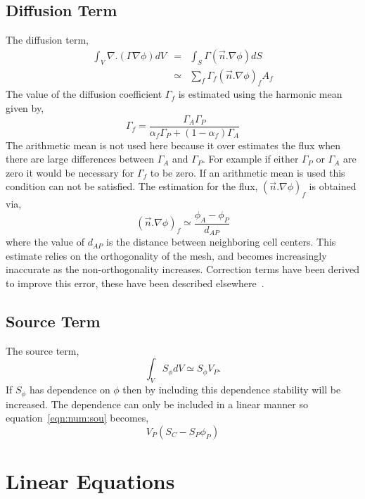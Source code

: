 \subsection{Diffusion Term}

The diffusion term,
\begin{eqnarray}
\int_V \nabla.(\Gamma\nabla\phi) dV & = & \int_S \Gamma (\vec{n}.\nabla\phi) dS \\
& \simeq & \sum_f \Gamma_f (\vec{n}.\nabla\phi)_f A_f
\label{eqn:num:dif}
\end{eqnarray}
The value of the diffusion coefficient $\Gamma_f$ is estimated using
the harmonic mean~\cite{patankar}
given by,
\begin{equation}
\Gamma_f = \frac{\Gamma_A\Gamma_P}{\alpha_f \Gamma_P + (1-\alpha_f) \Gamma_A}
\end{equation}
The arithmetic mean is not used here because it over estimates the flux
when there are large differences between $\Gamma_A$ and $\Gamma_P$.
For example if either $\Gamma_P$ or $\Gamma_A$ are zero it
would be necessary for $\Gamma_f$ to be zero. If an arithmetic mean
is used this condition can not be satisfied.
The estimation for the flux, $(\vec{n}.\nabla\phi)_f$ is obtained via,
\begin{equation}
(\vec{n}.\nabla\phi)_f \simeq \frac{\phi_A-\phi_P}{d_{AP}}
\end{equation}
where the value of $d_{AP}$ is the distance between neighboring cell centers.
This estimate relies on the orthogonality of the mesh, and becomes
increasingly inaccurate as the non-orthogonality increases. Correction terms
have been derived to improve this error, these have been described
elsewhere~\cite{croftphd}.

\subsection{Source Term}

The source term, 
\begin{equation}
\int_V S_{\phi} dV \simeq S_\phi V_P.
\label{eqn:num:sou}
\end{equation}
If $S_\phi$ has dependence on $\phi$ then by including this dependence
stability will be increased. The dependence can only be included in
a linear manner so equation~\eqref{eqn:num:sou} becomes,
\begin{equation}
V_P (S_C - S_P \phi_P)
\end{equation}

\section{Linear Equations}

